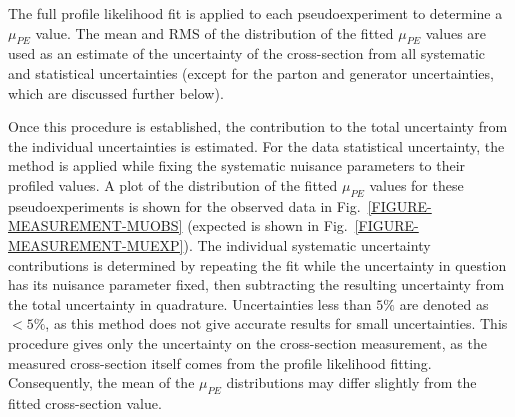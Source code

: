 The full profile likelihood fit is applied to each pseudoexperiment to determine a $\mu_{PE}$ value. The mean and RMS of the distribution of the fitted $\mu_{PE}$ values are used as an estimate of the uncertainty of the cross-section from all systematic and statistical uncertainties (except for the parton and generator uncertainties, which are discussed further below).


Once this procedure is established, the contribution to the total uncertainty from the individual uncertainties is estimated. For the data statistical uncertainty, the method is applied while fixing the systematic nuisance parameters to their profiled values. A plot of the distribution of the fitted $\mu_{PE}$ values for these pseudoexperiments is shown for the observed data in Fig.~\ref{FIGURE-MEASUREMENT-MUOBS} (expected is shown in Fig.~\ref{FIGURE-MEASUREMENT-MUEXP}). The individual systematic uncertainty contributions is determined by repeating the fit while the uncertainty in question has its nuisance parameter fixed, then subtracting the resulting uncertainty from the total uncertainty in quadrature. Uncertainties less than $5\%$ are denoted as $<5\%$, as this method does not give accurate results for small uncertainties. This procedure gives only the uncertainty on the cross-section measurement, as the measured cross-section itself comes from the profile likelihood fitting. Consequently, the mean of the $\mu_{PE}$ distributions may differ slightly from the fitted cross-section value.


